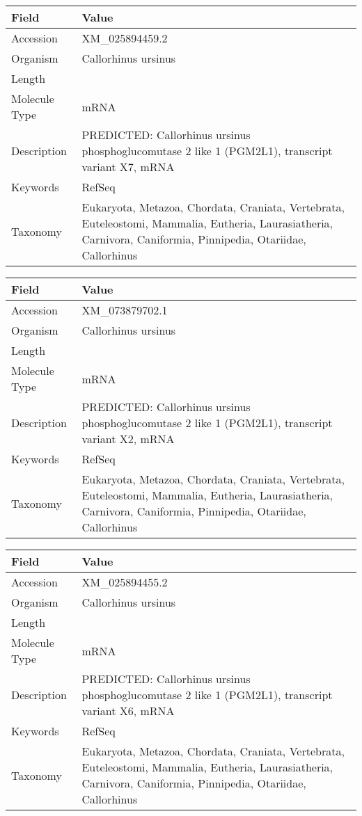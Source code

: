 \documentclass[10pt]{article}
\begin{document}
{\footnotesize
\begin{longtable}{>{\raggedright\arraybackslash}p{4.5cm} >{\raggedright\arraybackslash}p{11.5cm}}
\textbf{Field} & \textbf{Value} \\
\hline
Accession & XM\_025894459.2 \\
Organism & Callorhinus ursinus \\
Length & 2612 \\
Molecule Type & mRNA \\
Description & PREDICTED: Callorhinus ursinus phosphoglucomutase 2 like 1 (PGM2L1), transcript variant X7, mRNA \\
Keywords & RefSeq \\
Taxonomy & Eukaryota, Metazoa, Chordata, Craniata, Vertebrata, Euteleostomi, Mammalia, Eutheria, Laurasiatheria, Carnivora, Caniformia, Pinnipedia, Otariidae, Callorhinus \\
\end{longtable}
}

{\footnotesize
\begin{longtable}{>{\raggedright\arraybackslash}p{4.5cm} >{\raggedright\arraybackslash}p{11.5cm}}
\textbf{Field} & \textbf{Value} \\
\hline
Accession & XM\_073879702.1 \\
Organism & Callorhinus ursinus \\
Length & 2960 \\
Molecule Type & mRNA \\
Description & PREDICTED: Callorhinus ursinus phosphoglucomutase 2 like 1 (PGM2L1), transcript variant X2, mRNA \\
Keywords & RefSeq \\
Taxonomy & Eukaryota, Metazoa, Chordata, Craniata, Vertebrata, Euteleostomi, Mammalia, Eutheria, Laurasiatheria, Carnivora, Caniformia, Pinnipedia, Otariidae, Callorhinus \\
\end{longtable}
}

{\footnotesize
\begin{longtable}{>{\raggedright\arraybackslash}p{4.5cm} >{\raggedright\arraybackslash}p{11.5cm}}
\textbf{Field} & \textbf{Value} \\
\hline
Accession & XM\_025894455.2 \\
Organism & Callorhinus ursinus \\
Length & 2854 \\
Molecule Type & mRNA \\
Description & PREDICTED: Callorhinus ursinus phosphoglucomutase 2 like 1 (PGM2L1), transcript variant X6, mRNA \\
Keywords & RefSeq \\
Taxonomy & Eukaryota, Metazoa, Chordata, Craniata, Vertebrata, Euteleostomi, Mammalia, Eutheria, Laurasiatheria, Carnivora, Caniformia, Pinnipedia, Otariidae, Callorhinus \\
\end{longtable}
}
\end{document}

